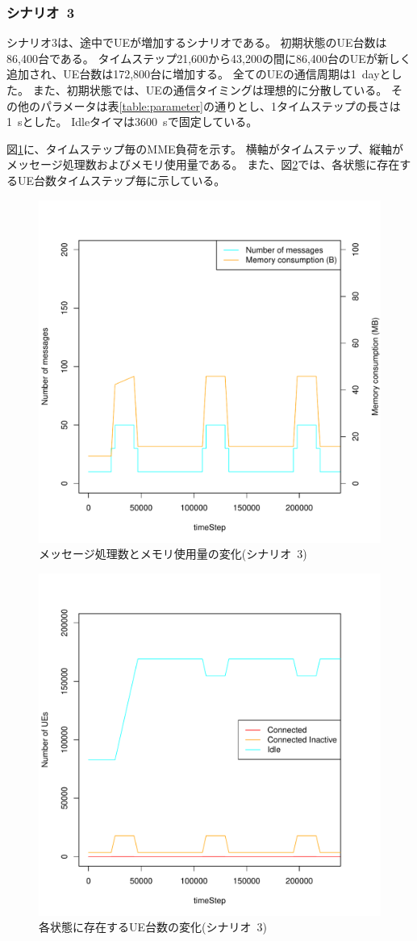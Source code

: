 \documentclass[a4j]{ujarticle}
\begin{document}
\subsubsection{シナリオ~3}
シナリオ3は、途中でUEが増加するシナリオである。
初期状態のUE台数は86,400台である。
タイムステップ21,600から43,200の間に86,400台のUEが新しく追加され、UE台数は172,800台に増加する。
全てのUEの通信周期は1~dayとした。%
また、初期状態では、UEの通信タイミングは理想的に分散している。
その他のパラメータは表\ref{table:parameter}の通りとし、1タイムステップの長さは1~sとした。
Idleタイマは3600~sで固定している。

図\ref{scenario_3_signaling_and_memoryload_vs_timeStep}に、タイムステップ毎のMME負荷を示す。
横軸がタイムステップ、縦軸がメッセージ処理数およびメモリ使用量である。
また、図\ref{scenario_3_stateBreakdown}では、各状態に存在するUE台数タイムステップ毎に示している。

\begin{figure}[htbp]
  \begin{center}
    \includegraphics[width=0.6\hsize]{scenario_4_signaling_and_memoryload_vs_timeStep_all.pdf}
    \caption{メッセージ処理数とメモリ使用量の変化(シナリオ~3)}
    \label{scenario_3_signaling_and_memoryload_vs_timeStep}
  \end{center}
\end{figure}
\begin{figure}[htbp]
  \begin{center}
    \includegraphics[width=0.6\hsize]{scenario_4_stateBreakdown_all.pdf}
    \caption{各状態に存在するUE台数の変化(シナリオ~3)}
    \label{scenario_3_stateBreakdown}
  \end{center}
\end{figure}
\clearpage
\end{document}
